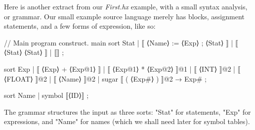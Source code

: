 \documentclass[11pt]{article} %
\begin{document}
\begin{example}\label{ex:syntax}
  Here is another extract from our \emph{First.hx} example, with a small syntax analysis, or
  grammar. Our small example source language merely has blocks, assignment statements, and a few
  forms of expression, like so:
\begin{hacs}[xleftmargin=\parindent,xrightmargin=\parindent,numbers=right]
// Main program construct.
main sort Stat  | ⟦ ⟨Name⟩ := ⟨Exp⟩ ; ⟨Stat⟩ ⟧
                | ⟦ { ⟨Stat⟩ } ⟨Stat⟩ ⟧
                | ⟦⟧ ;

sort Exp  | ⟦ ⟨Exp⟩ + ⟨Exp@1⟩ ⟧
          | ⟦ ⟨Exp@1⟩ * ⟨Exp@2⟩ ⟧@1
          | ⟦ ⟨INT⟩ ⟧@2
          | ⟦ ⟨FLOAT⟩ ⟧@2
          | ⟦ ⟨Name⟩ ⟧@2
          | sugar ⟦ ( ⟨Exp#⟩ ) ⟧@2 → Exp# ;

sort Name | symbol ⟦⟨ID⟩⟧ ;
\end{hacs}

  The grammar structures the input as three sorts: "Stat" for statements, "Exp" for expressions, and
  "Name" for names (which we shall need later for symbol tables).
\end{example}
\end{document}
